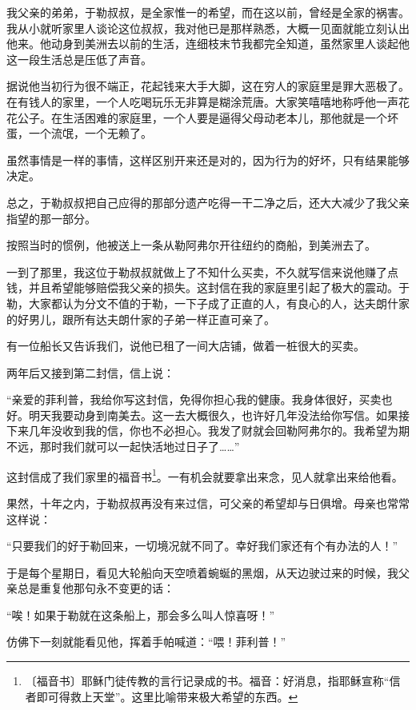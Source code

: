\documentclass[12pt,UTF-8,openany]{ctexbook}
\begin{document}
\begin{normalsize}
    我父亲的弟弟，于勒叔叔，是全家惟一的希望，而在这以前，曾经是全家的祸害。我从小就听家里人谈论这位叔叔，我对他已是那样熟悉，大概一见面就能立刻认出他来。他动身到美洲去以前的生活，连细枝末节我都完全知道，虽然家里人谈起他这一段生活总是压低了声音。
    
    据说他当初行为很不端正，花起钱来大手大脚，这在穷人的家庭里是罪大恶极了。在有钱人的家里，一个人吃喝玩乐无非算是糊涂荒唐。大家笑嘻嘻地称呼他一声花花公子。在生活困难的家庭里，一个人要是逼得父母动老本儿，那他就是一个坏蛋，一个流氓，一个无赖了。
    
    虽然事情是一样的事情，这样区别开来还是对的，因为行为的好坏，只有结果能够决定。
    
    总之，于勒叔叔把自己应得的那部分遗产吃得一干二净之后，还大大减少了我父亲指望的那一部分。
    
    按照当时的惯例，他被送上一条从勒阿弗尔开往纽约的商船，到美洲去了。
    
    一到了那里，我这位于勒叔叔就做上了不知什么买卖，不久就写信来说他赚了点钱，并且希望能够赔偿我父亲的损失。这封信在我的家庭里引起了极大的震动。于勒，大家都认为分文不值的于勒，一下子成了正直的人，有良心的人，达夫朗什家的好男儿，跟所有达夫朗什家的子弟一样正直可亲了。
    
    有一位船长又告诉我们，说他已租了一间大店铺，做着一桩很大的买卖。
    
    两年后又接到第二封信，信上说：
    
    “亲爱的菲利普，我给你写这封信，免得你担心我的健康。我身体很好，买卖也好。明天我要动身到南美去。这一去大概很久，也许好几年没法给你写信。如果接下来几年没收到我的信，你也不必担心。我发了财就会回勒阿弗尔的。我希望为期不远，那时我们就可以一起快活地过日子了……”
    
    这封信成了我们家里的福音书\footnote{〔福音书〕耶稣门徒传教的言行记录成的书。福音：好消息，指耶稣宣称“信者即可得救上天堂”。这里比喻带来极大希望的东西。}。一有机会就要拿出来念，见人就拿出来给他看。
    
    果然，十年之内，于勒叔叔再没有来过信，可父亲的希望却与日俱增。母亲也常常这样说：
    
    “只要我们的好于勒回来，一切境况就不同了。幸好我们家还有个有办法的人！”
    
    于是每个星期日，看见大轮船向天空喷着蜿蜒的黑烟，从天边驶过来的时候，我父亲总是重复他那句永不变更的话：
    
    “唉！如果于勒就在这条船上，那会多么叫人惊喜呀！”
    
    仿佛下一刻就能看见他，挥着手帕喊道：“喂！菲利普！”
    

\end{normalsize}
\end{document}
